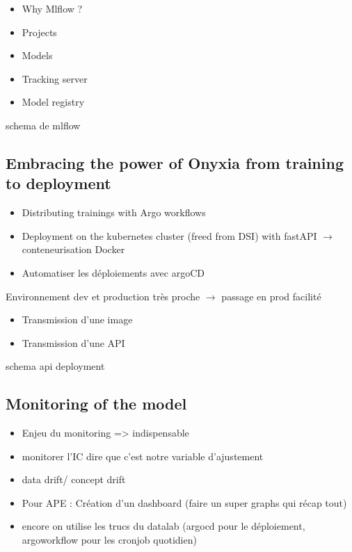 \begin{itemize}
    \item Why Mlflow ?
    \item Projects
    \item Models
    \item Tracking server
    \item Model registry
\end{itemize}

schema de mlflow

\subsection{Embracing the power of Onyxia from training to deployment}

\begin{itemize}
    \item Distributing trainings with Argo workflows
    \item Deployment on the kubernetes cluster (freed from DSI) with fastAPI  $\rightarrow$ conteneurisation Docker
    \item Automatiser les déploiements avec argoCD
\end{itemize}

Environnement dev et production très proche $\rightarrow$ passage en prod facilité
\begin{itemize}
    \item Transmission d'une image
    \item Transmission d'une API
\end{itemize}

schema api deployment

\subsection{Monitoring of the model}

\begin{itemize}
    \item Enjeu du monitoring => indispensable
    \item monitorer l'IC dire que c'est notre variable d'ajustement
    \item data drift/ concept drift
    \item Pour APE : Création d'un dashboard (faire un super graphs qui récap tout)
    \item encore on utilise les trucs du datalab (argocd pour le déploiement, argoworkflow pour les cronjob quotidien)
\end{itemize}

